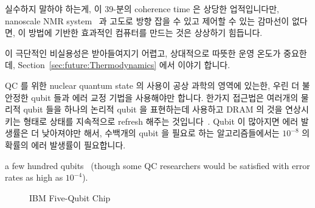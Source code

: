 실수하지 말하야 하는게, 이 39-분의 coherence time 은 상당한 업적입니다만,
nanoscale NMR system~\cite{HJMamin2013QC-nanoscale-NMR} 과 고도로 방향 잡을 수
있고 제어할 수 있는 감마선이 없다면, 이 방법에 기반한 효과적인 컴퓨터를 만드는
것은 상상하기 힘듭니다.

이 극단적인 비실용성은 받아들여지기 어렵고, 상대적으로 따뜻한 운영 온도가
중요한데,
Section~\ref{sec:future:Thermodynamics} 에서 이야기 합니다.

QC 를 위한 nuclear quantum state 의 사용이 공상 과학의 영역에 있는한, 우린 더
불안정한 qubit 들과 에러 교정 기법을 사용해야만 합니다.
한가지 접근법은 여러개의 물리적 qubit 들을 하나의 논리적 qubit 을 표현하는데
사용하고 DRAM 의 것을 연상시키는 형태로 상태를 지속적으로 refresh 해주는
것입니다~\cite{DanielThomasSankPhD}.
Qubit 이 많아지면 에러 발생률은 더 낮아져야만 해서, 수백개의 qubit 을 필요로
하는 알고리즘들에서는 $10^{-8}$ 의 확률의 에러 발생률이 필요합니다.

a few hundred qubits~\cite{DanielThomasSankPhD} (though some
QC researchers would be satisfied with error rates as high as
$10^{-4}$).

\begin{figure}[tb]
\centering
{}
\caption{IBM Five-Qubit Chip}
\label{fig:future:IBM Five-Qubit Chip}
\end{figure}

